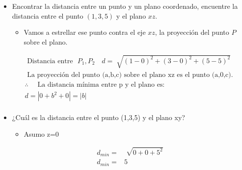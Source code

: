 \begin{itemize}
    \item Encontrar la distancia entre un punto y un plano coordenado, encuentre la distancia entre el punto $(1,3,5)$ y el plano $xz$.
        \begin{itemize}
            \item Vamos a estrellar ese punto contra el eje $xz$, la proyección del punto $P$ sobre el plano.
        \end{itemize}
        \begin{align*}
            \text{  Distancia entre   }\,\, P_1,P_2 \quad d=\sqrt[]{(1-0)^2+(3-0)^2+(5-5)^2} \\ 
            \text{  La proyección del punto (a,b,c) sobre el plano xz es el punto (a,0,c).  }\\ 
            \therefore \quad \text{  La distancia mínima entre p y el plano es:  } \\ 
            d=\left| 0+b^2+0 \right| = \left| b \right| \\ 
        \end{align*}
    
    
    \item ¿Cuál es la distancia entre el punto (1,3,5) y el plano xy?
        \begin{itemize}
            \item Asumo z=0
        \end{itemize}
        \begin{center}
           \begin{align*}
               d_{min}=&\sqrt[]{0+0+5^2}\\ 
               d_{min}=&5 \\ 
           \end{align*}
        \end{center}
    

\end{itemize}
